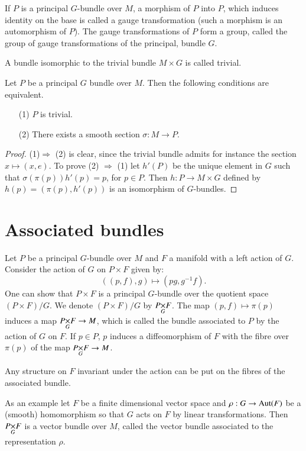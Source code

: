 If $P$ is a principal $G$-bundle over $M$, a morphism of $P$ into $P$, which induces identity on the base is called a gauge transformation (such a morphism is an automorphism of $P$). The gauge transformations of $P$ form a group, called the group of gauge transformations of the principal, bundle $G$.

A bundle isomorphic to the trivial bundle $M\times G$ is called trivial.

\begin{proposition}\label{chap10-prop10.1}
Let $P$ be a principal $G$ bundle over $M$. Then the following conditions are equivalent.
\begin{itemize}
\item[\rm(1)] $P$ is trivial.

\item[\rm(2)] There exists a smooth section $\sigma:M\to P$.
\end{itemize}
\end{proposition}

\begin{proof}
(1)\pageoriginale $\Rightarrow$ (2) is clear, since the trivial bundle admits for instance the section $x\mapsto (x,e)$. To prove (2) $\Rightarrow$ (1) let $h'(P)$ be the unique element in $G$ such that $\sigma(\pi(p))h'(p)=p$, for $p\in P$. Then $h:P\to M\times G$ defined by $h(p)=(\pi(p),h'(p))$ is an isomorphism of $G$-bundles.
\end{proof}

\section*{Associated bundles}

Let $P$ be a principal $G$-bundle over $M$ and $F$ a manifold with a left action of $G$. Consider the action of $G$ on $P\times F$ given by:
$$
((p,f),g)\mapsto (pg,g^{-1}f).
$$
One can show that $P\times F$ is a principal $G$-bundle over the quotient space $(P\times F)/G$. We denote $(P\times F)/G$ by $\fprod{P}{F}{G}$. The map $(p,f)\mapsto \pi(p)$ induces a map $\fprod{P}{F}{G}\to M$, which is called the bundle associated to $P$ by the action of $G$ on $F$. If $p\in P$, $p$ induces a diffeomorphism of $F$ with the fibre over $\pi(p)$ of the map $\fprod{P}{F}{G}\to M$.

Any structure on $F$ invariant under the action can be put on the fibres of the associated bundle.

As an example let $F$ be a finite dimensional vector space and $\rho:G\to \operatorname{Aut}(F)$ be a (smooth) homomorphism so that $G$ acts on $F$ by linear transformations. Then $\fprod{P}{F}{G}$ is a vector bundle over $M$, called the vector bundle associated to the representation $\rho$. 

